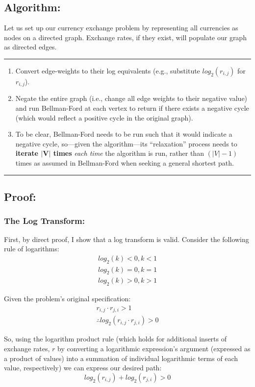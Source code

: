 \documentclass[conference]{styles/acmsiggraph}
\newcommand{\?}{\stackrel{?}{=}}
\begin{document}
\subsection{Algorithm:}
Let us set up our currency exchange problem by representing all currencies as nodes on a directed graph.  Exchange rates, if they exist, will populate our graph as directed edges.

\rule{\textwidth}{0.4pt}
\begin{enumerate}
    \item Convert edge-weights to their log equivalents (e.g., substitute $log_2(r_{i,j})$ for $r_{i,j}$).
    \item Negate the entire graph (i.e., change all edge weights to their negative value) and run Bellman-Ford at each vertex to return if there exists a negative cycle (which would reflect a positive cycle in the original graph).  
    \item To be clear, Bellman-Ford needs to be run such that it would indicate a negative cycle, so---given the algorithm---its \enquote{relaxation} process needs to \textbf{iterate $\mathbf{|V|}$ times} \textit{each time} the algorithm is run, rather than $(|V|-1)$ times as assumed in Bellman-Ford when seeking a general shortest path.
\end{enumerate}
\rule{\textwidth}{0.4pt}

\subsection{Proof:}
\subsubsection{The Log Transform:}
First, by direct proof, I show that a log transform is valid.  Consider the following rule of logarithms:
\begin{align}
    log_2(k) < 0, k < 1\\
    log_2(k) = 0, k = 1\\
    log_2(k) > 0, k > 1
\end{align}

Given the problem's original specification:
\begin{align}
    r_{i,j} \cdot r_{j,i} > 1\\
    \therefore log_2(r_{i,j} \cdot r_{j,i}) > 0
\end{align}

So, using the logarithm product rule (which holds for additional inserts of exchange rates, $r$ by converting a logarithmic expression's argument (expressed as a product of values) into a summation of individual logarithmic terms of each value, respectively) we can express our desired path:
\begin{equation} \label{eq:positive_sum}
    log_2(r_{i,j}) + log_2(r_{j,i}) > 0
\end{equation}
\end{document}
